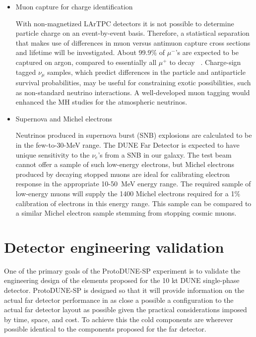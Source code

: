 \begin{itemize}
\item Muon capture for charge identification

With non-magnetized LArTPC detectors it is not possible to determine particle charge on an event-by-event basis. Therefore, a statistical separation that makes use of differences in muon versus antimuon capture cross sections and lifetime will be investigated.
About 99.9\% of $\mu^-$'s are expected to be captured on argon, compared to essentially all $\mu^+$ to decay ~\cite{stopmu}.
Charge-sign tagged $\nu_\mu$ samples, which predict differences in the particle and antiparticle survival probabilities, may be useful for constraining exotic possibilities, such as non-standard neutrino interactions. 
A well-developed muon tagging would enhanced the MH studies for the atmospheric neutrinos. 

\item Supernova and Michel electrons

Neutrinos produced in supernova burst (SNB) explosions are calculated to be in the few-to-30-MeV range.
The DUNE Far Detector is expected to have unique sensitivity to the $\nu_e$'s from a SNB in our galaxy.
%
The test beam cannot offer a sample of  such low-energy electrons, but Michel electrons  produced by 
decaying stopped muons are ideal for calibrating electron response in the appropriate 10-50~MeV energy range. 
The required  sample of low-energy muons will supply the 1400 Michel electrons required for a 1\% 
calibration of electrons in this energy range. This sample can be compared to a similar Michel electron sample
stemming from stopping cosmic muons.

\end{itemize}



\section{Detector engineering validation}

One of the primary goals of the ProtoDUNE-SP experiment is to validate the engineering design of the elements proposed for the 10 kt DUNE single-phase detector. ProtoDUNE-SP is designed so that it will provide information on the actual far detector performance in as close a possible a configuration to the actual far detector layout as possible given the practical considerations imposed by time, space, and cost. To achieve this the cold components are wherever possible identical to the components proposed for the far detector. 

